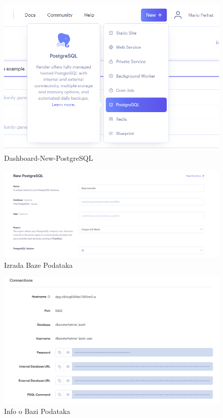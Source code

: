 			\begin{figure} [H]
				\includegraphics[width=\linewidth]{Slike/Dashboard-New-PostgreSQL}
				\caption{Dashboard-New-PostgreSQL}
			\end{figure}
			
			\begin{figure} [H]
				\includegraphics[width=\linewidth]{Slike/Izrada Baze Podataka}
				\caption{Izrada Baze Podataka}
			\end{figure}
			
			\begin{figure} [H]
				\includegraphics[width=\linewidth]{Slike/Info o Bazi Podataka}
				\caption{Info o Bazi Podataka}
			\end{figure}
			
